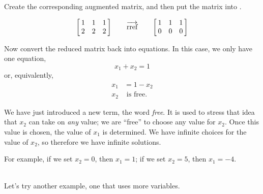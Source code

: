 {Create the corresponding augmented matrix, and then put the matrix into \rref. 

$$\bmx{ccc} 1&1&1\\2&2&2\emx \qquad \overrightarrow{\text{rref}} \qquad \bmx{ccc} 1&1&1\\0&0&0\emx $$

Now convert the reduced matrix back into equations. In this case, we only have one equation, $$x_1+x_2=1$$ or, equivalently, 
\begin{align*} x_1 &=1-x_2\\ x_2&\text{ is free}. \end{align*}

We have just introduced a new term, the word \textit{free}. It is used to stress that idea that $x_2$ can take on \textit{any} value; we are ``free'' to choose any value for $x_2$. Once this value is chosen, the value of $x_1$ is determined. We have infinite choices for the value of $x_2$, so therefore we have infinite solutions.

For example, if we set $x_2 = 0$, then $x_1 = 1$; if we set $x_2 = 5$, then $x_1 = -4$. 
}\\

Let's try another example, one that uses more variables.\\

